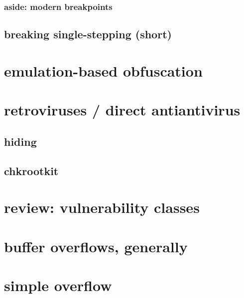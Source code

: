 \subsubsection{aside: modern breakpoints}


\subsection{breaking single-stepping (short)}


\section{emulation-based obfuscation}


\section{retroviruses / direct antiantivirus}


\subsection{hiding}


\subsection{chkrootkit}


\begin{frame}{}
\end{frame}

\section{review: vulnerability classes}


\section{buffer overflows, generally}


\section{simple overflow}


